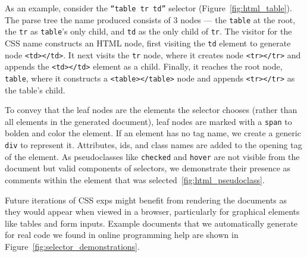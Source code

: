 As an example, consider the \texttt{``table tr td''} selector (Figure~\ref{fig:html_table}).
The parse tree the \Gls{name} produced consists of 3 nodes --- the \texttt{table} at the root, the \texttt{tr} as \texttt{table}'s only child, and \texttt{td} as the only child of \texttt{tr}.
The visitor for the CSS \Gls{name} constructs an HTML node, first visiting the \texttt{td} element to generate node \texttt{<td></td>}.
It next visits the \texttt{tr} node, where it creates node \texttt{<tr></tr>} and appends the \texttt{<td></td>} element as a child.
Finally, it reaches the root node, \texttt{table}, where it constructs a \texttt{<table></table>} node and appends \texttt{<tr></tr>} as the table's child.
\fi

To convey that the leaf nodes are the elements the selector chooses (rather than all elements in the generated document), leaf nodes are marked with a \texttt{span} to bolden and color the element.
If an element has no tag name, we create a generic \texttt{div} to represent it.
Attributes, ids, and class names are added to the opening tag of the element.
As pseudoclasses like \texttt{checked} and \texttt{hover} are not visible from the document but valid components of selectors, we demonstrate their presence as comments within the element that was selected~\ref{fig:html_pseudoclass}.

Future iterations of CSS \glspl{exp} might benefit from rendering the documents as they would appear when viewed in a browser, particularly for graphical elements like tables and form inputs.
Example documents that we automatically generate for real code we found in online programming help are shown in Figure~\ref{fig:selector_demonstrations}.
\fi
{}
\fi

